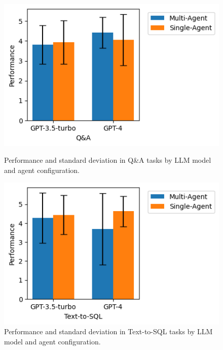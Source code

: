             \begin{figure}[h]
                \centering
                \begin{minipage}{.48\textwidth}
                    \centering                
                        \includegraphics[width=1\linewidth]{images/performance_QA.png}
                    \caption{Performance and standard deviation in Q\&A tasks by LLM model and agent configuration.\\}
                    \label{fig:performance_QA}
                \end{minipage}
                \hspace{0.2cm}
                \begin{minipage}{.48\textwidth}
                    \centering
                    \includegraphics[width=1\linewidth]{images/performance_text2sql.png}
                    \caption{Performance and standard deviation in Text-to-SQL tasks by LLM model and agent configuration.}
                    \label{fig:performance_text2sql}
                \end{minipage}%
            \end{figure}

